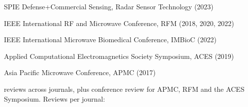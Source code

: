 \begin{cvbullets}
    \item SPIE Defense+Commercial Sensing, Radar Sensor Technology (2023)
    \item IEEE International RF and Microwave Conference, RFM (2018, 2020, 2022)
    \item IEEE International Microwave Biomedical Conference, IMBioC (2022)
    \item Applied Computational Electromagnetics Society Symposium, ACES (2019)
    \item Asia Pacific Microwave Conference, APMC (2017)
\end{cvbullets}


\begin{cvparagraph}
    \cvReviews{} reviews across \cvReviewJournals{} journals, plus conference review for APMC, RFM and the ACES Symposium. Reviews per journal:
\end{cvparagraph}

